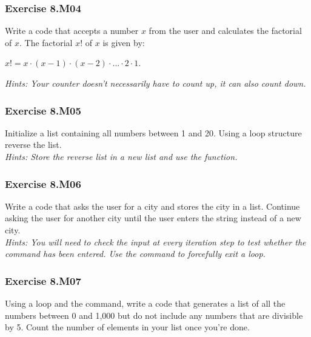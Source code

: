 
\subsubsection*{Exercise 8.M04 \red{[M]}}
Write a code that accepts a number $x$ from the user and calculates the factorial of $x$. The factorial $x!$ of $x$ is given by:
\begin{center}
$x! = x \cdot  (x-1) \cdot (x-2) \cdot ... \cdot 2 \cdot 1$.
\end{center}

\textit{Hints:
Your counter doesn't necessarily have to count up, it can also count down.}\\[1cm]



\subsubsection*{Exercise 8.M05}
Initialize a list containing all numbers between 1 and 20. Using a loop structure reverse the list.\\

\textit{Hints:
Store the reverse list in a new list and use the {} function.}\\[1cm]



\subsubsection*{Exercise 8.M06}
Write a code that asks the user for a city and stores the city in a list. Continue asking the user for another city until the user enters the string {} instead of a new city.\\


\textit{Hints:
You will need to check the input at every iteration step to test whether the {} command has been entered. Use the {} command to forcefully exit a loop.}\\[1cm]



\subsubsection*{Exercise 8.M07}
Using a {} loop and the {} command, write a code that generates a list of all the numbers between 0 and 1,000 but do not include any numbers that are divisible by 5. Count the number of elements in your list once you’re done.\\


